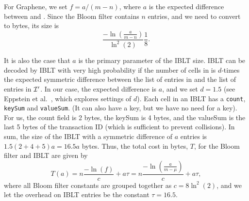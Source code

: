 For Graphene, we set $f=a/(m-n)$,
where $a$ is the expected difference between \I and \Ip .
Since the Bloom filter contains $n$ entries, and we need to convert to
bytes, its size is 
$$\frac{-\ln(\frac{a}{m-n})}{\ln^2(2)}\frac18. $$

It is also the case that $a$ is the primary parameter of the IBLT
size.  IBLT \I can be decoded by IBLT \Ip with very high probability
if the number of cells in \I is $d$-times the expected symmetric
difference between the list of entries in \I and the list of entries
in $\cal{I}'$. In our case, the expected difference is $a$, and we set
$d=1.5$ (see Eppstein et al.~\cite{eppstein:2011}, which explores
settings of $d$). Each cell in an IBLT has a {\tt count}, {\tt keySum} and
{\tt valueSum}.
(It can also have a key, but we have
no need for a key). For us, the count field is 2 bytes, the
keySum is 4 bytes, and the valueSum is the last 5 bytes of the
transaction ID (which is sufficient to prevent collisions). In sum,
the size of the IBLT with a symmetric difference of $a$ entries is
$1.5(2+4+5)a=16.5a$ bytes.
Thus, the total cost in bytes, $T$, for the Bloom filter and IBLT are
given by 
$$T(a)= n\frac{-\ln(f)}{c}+ a\tau = n\frac{-\ln(\frac{a}{m-\mu})}{c}+ a\tau,$$ 
where all Bloom filter constants are grouped together as
$c=8\ln^2(2)$, and we let the overhead on IBLT entries be the constant
$\tau=16.5$.

